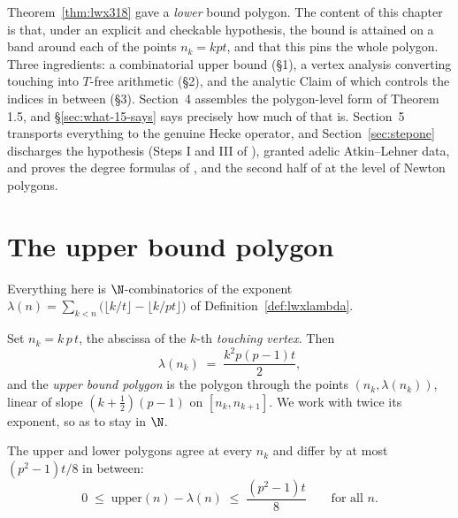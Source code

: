Theorem~\ref{thm:lwx318} gave a \emph{lower} bound polygon.  The content of this chapter is that,
under an explicit and checkable hypothesis, the bound is attained on a band around each of the
points $n_k = kpt$, and that this pins the whole polygon.  Three ingredients:
a combinatorial upper bound (\S1), a vertex analysis converting touching into $T$-free
arithmetic (\S2), and the analytic Claim of \cite[\S4.2]{LWX} which controls the indices in
between (\S3).  Section~4 assembles the polygon-level form of Theorem 1.5, and
\S\ref{sec:what-15-says} says precisely how much of \cite[Theorem 1.5]{LWX} that is.
Section~5 transports everything to the genuine Hecke operator, and
Section~\ref{sec:stepone} discharges the hypothesis (Steps I and III of \cite[\S3.23]{LWX}),
granted adelic Atkin--Lehner data, and proves the degree formulas of \cite[Theorem 1.3]{LWX},
\cite[Corollary 1.4]{LWX} and the second half of \cite[Theorem 1.5]{LWX} at the level of Newton
polygons.

\section{The upper bound polygon}

Everything here is $\N$-combinatorics of the exponent
$\lambda(n) = \sum_{k<n}\bigl(\lfloor k/t\rfloor - \lfloor k/pt\rfloor\bigr)$ of
Definition~\ref{def:lwxlambda}.

\begin{definition}
  \label{def:touchx}
  \leanok
  Set $n_k = k\,p\,t$, the abscissa of the $k$-th \emph{touching vertex}.  Then
  \cite[(3.23.1)]{LWX}
  \[
    \lambda(n_k) \;=\; \frac{k^{2}p(p-1)t}{2},
  \]
  and the \emph{upper bound polygon} is the polygon through the points $(n_k, \lambda(n_k))$,
  linear of slope $(k+\tfrac12)(p-1)$ on $[n_k, n_{k+1}]$.  We work with twice its exponent, so
  as to stay in $\N$.
\end{definition}

\begin{lemma}
  \label{lem:lwx41}
  \leanok
  The upper and lower polygons agree at every $n_k$ and differ by at most
  $(p^{2}-1)t/8$ in between:
  \[
    0 \;\leq\; \mathrm{upper}(n) - \lambda(n) \;\leq\; \frac{(p^{2}-1)t}{8}
    \qquad\text{for all } n .
  \]
\end{lemma}

